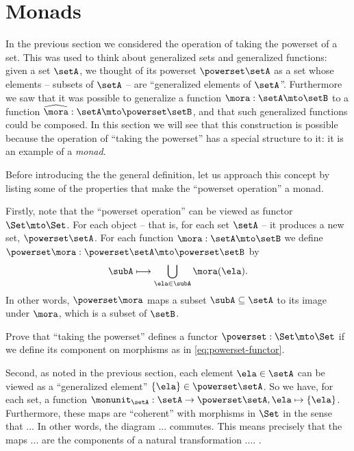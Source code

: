 

\section{Monads}
\label{sec:monads}

In the previous section we considered the operation of taking the powerset of a set. This was used to think about generalized sets and generalized functions: given a set $\setA$, we thought of its powerset $\powerset \setA$ as a set whose elements -- subsets of $\setA$ -- are ``generalized elements of $\setA$''. Furthermore we saw that it was possible to generalize a function $\mora : \setA \mto \setB$ to a function $\widehat \mora:  \setA \mto \powerset \setB$, and that such generalized functions could be composed. In this section we will see that this construction is possible because the operation of ``taking the powerset'' has a special structure to it: it is an example of a \emph{monad}. 

Before introducing the the general definition, let us approach this concept by listing some of the properties that make the ``powerset operation''  a monad. 

Firstly, note that the ``powerset operation'' can be viewed as functor $\Set \mto \Set$. For each object -- that is, for each set $\setA$ -- it produces a new set, $\powerset \setA$. For each function $\mora: \setA \mto \setB$ we define $\powerset \mora : \powerset \setA \mto \powerset \setB$ by
\begin{equation}\label{eq:powerset-functor}
 \subA \longmapsto \bigcup_{\ela \in \subA} \mora(\ela).
\end{equation}
In other words, $\powerset \mora$ maps a subset $\subA \subseteq \setA$ to its image under $\mora$, which is a subset of $\setB$. 


\begin{gradedexercise}\label{ex:PowersetImageFunctor}
Prove that ``taking the powerset'' defines a functor $\powerset : \Set \mto \Set$ if we define its component on morphisms as in \cref{eq:powerset-functor}.
\end{gradedexercise}


Second, as noted in the previous section, each element $\ela \in \setA$ can be viewed as a ``generalized element'' $\{ \ela \} \in \powerset \setA$. So we have, for each set, a function $\monunit_\setA : \setA \to \powerset \setA, \ela \mapsto \{ \ela \}$. 
Furthermore, these maps are ``coherent'' with morphisms in $\Set$ in the sense that ...  In other words, the diagram ... commutes. This means precisely that the maps ... are the components of a natural transformation .... . 


